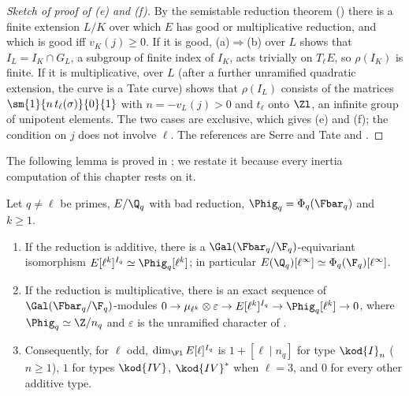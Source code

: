 \begin{proof}[Sketch of proof of (e) and (f)]
By the semistable reduction theorem () there is a finite extension $L/K$ over which $E$ has good or multiplicative reduction,
and which is good iff $v_K(j)\ge0$. If it is good, (a)$\Rightarrow$(b) over $L$ shows that $I_L=I_K\cap G_L$, a subgroup of finite index of $I_K$, acts
trivially on $T_\ell E$, so $\rho(I_K)$ is finite. If it is multiplicative,  over $L$ (after a further unramified quadratic
extension, the curve is a Tate curve) shows that $\rho(I_L)$ consists of the matrices $\sm{1}{n\,t_\ell(\sigma)}{0}{1}$ with $n=-v_L(j)>0$ and $t_\ell$ onto
$\Zl$, an infinite group of unipotent elements. The two cases are exclusive, which gives (e) and (f); the condition on $j$ does not involve $\ell$.
The references are Serre and Tate \cite[Section 1 and Section 2]{SerreTate68} and \cite[VII.7]{SilvermanAEC}.
\end{proof}

The following lemma is proved in ; we restate it because every inertia computation of this chapter rests on it.

\begin{lemma}\label{lem:galrep:component-invariants}
Let $q\ne\ell$ be primes, $E/\Q_q$ with bad reduction, $\Phig_q=\Phi_q(\Fbar_q)$ and $k\ge1$.
\begin{enumerate}[label=(\roman*)]
\item If the reduction is additive, there is a $\Gal(\Fbar_q/\F_q)$-equivariant isomorphism $E[\ell^k]^{I_q}\simeq\Phig_q[\ell^k]$; in particular
$E(\Q_q)[\ell^\infty]\simeq\Phi_q(\F_q)[\ell^\infty]$.
\item If the reduction is multiplicative, there is an exact sequence of $\Gal(\Fbar_q/\F_q)$-modules
$0\to\mu_{\ell^k}\otimes\varepsilon\to E[\ell^k]^{I_q}\to\Phig_q[\ell^k]\to0$, where $\Phig_q\simeq\Z/n_q$ and $\varepsilon$ is the unramified character of
.
\item Consequently, for $\ell$ odd, $\dim_{\Fl}E[\ell]^{I_q}$ is $1+[\ell\mid n_q]$ for type $\kod{I}_{n}$ ($n\ge1$), $1$ for types $\kod{IV}$, $\kod{IV}^*$ when
$\ell=3$, and $0$ for every other additive type.
\end{enumerate}
\end{lemma}

